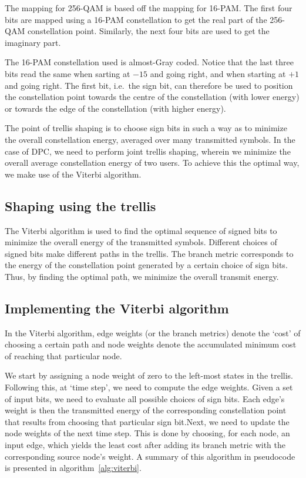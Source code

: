 The mapping for 256-QAM is based off the mapping for 16-PAM. The first four
bits are mapped using a 16-PAM constellation to get the real part of the
256-QAM constellation point. Similarly, the next four bits are used to get the
imaginary part.


The 16-PAM constellation used is almost-Gray coded. Notice that the last three
bits read the same when sarting at $-15$ and going right, and when starting at
$+1$ and going right. The first bit, i.e.\ the sign bit, can therefore be used
to position the constellation point towards the centre of the constellation
(with lower energy) or towards the edge of the constellation (with higher
energy).

The point of trellis shaping is to choose sign bits in such a way as to
minimize the overall constellation energy, averaged over many transmitted
symbols. In the case of DPC, we need to perform joint trellis shaping, wherein
we minimize the overall average constellation energy of two users. To achieve
this the optimal way, we make use of the Viterbi algorithm.

\subsection{Shaping using the trellis}

The Viterbi algorithm is used to find the optimal sequence of signed bits to
minimize the overall energy of the transmitted symbols. Different choices of
signed bits make different paths in the trellis. The branch metric corresponds
to the energy of the constellation point generated by a certain choice of sign
bits. Thus, by finding the optimal path, we minimize the overall transmit
energy.

\subsection{Implementing the Viterbi algorithm}

In the Viterbi algorithm, edge weights (or the branch metrics) denote the
`cost' of choosing a certain path and node weights denote the accumulated
minimum cost of reaching that particular node.

We start by assigning a node weight of zero to the left-most states in the
trellis. Following this, at `time step', we need to compute the edge weights.
Given a set of input bits, we need to evaluate all possible choices of sign
bits. Each edge's weight is then the transmitted energy of the corresponding
constellation point that results from choosing that particular sign bit.Next,
we need to update the node weights of the next time step. This is done by
choosing, for each node, an input edge, which yields the least cost after
adding its branch metric with the corresponding source node's weight. A summary
of this algorithm in pseudocode is presented in algorithm~\ref{alg:viterbi}.

